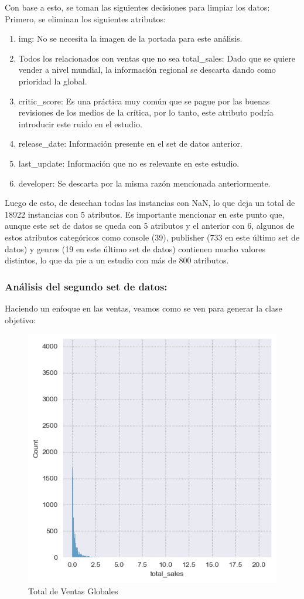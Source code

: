 \documentclass[a4paper]{article}
\begin{document}
    Con base a esto, se toman las siguientes decisiones para limpiar los datos: Primero, se eliminan los siguientes atributos:
    \begin{enumerate}
        \item img: No se necesita la imagen de la portada para este análisis.
        \item Todos los relacionados con ventas que no sea total\_sales: Dado que se quiere vender a nivel mundial, la información regional se descarta dando como prioridad la global.
        \item critic\_score: Es una práctica muy común que se pague por las buenas revisiones de los medios de la crítica, por lo tanto, este atributo podría introducir este ruido en el estudio.
        \item release\_date: Información presente en el set de datos anterior.
        \item last\_update: Información que no es relevante en este estudio.
        \item developer: Se descarta por la misma razón mencionada anteriormente. 
    \end{enumerate}

    Luego de esto, de desechan todas las instancias con NaN, lo que deja un total de 18922 instancias con 5 atributos. Es importante mencionar en este punto que, aunque este set de datos se queda con 5 atributos y el anterior con 6, algunos de estos atributos categóricos como console (39), publisher (733 en este último set de datos) y genres (19 en este último set de datos) contienen mucho valores distintos, lo que da pie a un estudio con más de 800 atributos.

\subsubsection{Análisis del segundo set de datos:}
Haciendo un enfoque en las ventas, veamos como se ven para generar la clase objetivo:

    \begin{figure}[hbtp!]
        \centering
        \includegraphics[width=0.5\linewidth]{Module_4_BigData//Proyecto//Propuestas//Imagenes/dataset2_totalVentasCompleto_histogram.png}
        \caption{Total de Ventas Globales}
        \label{fig:total_ventas_globales}
    \end{figure}
\end{document}
